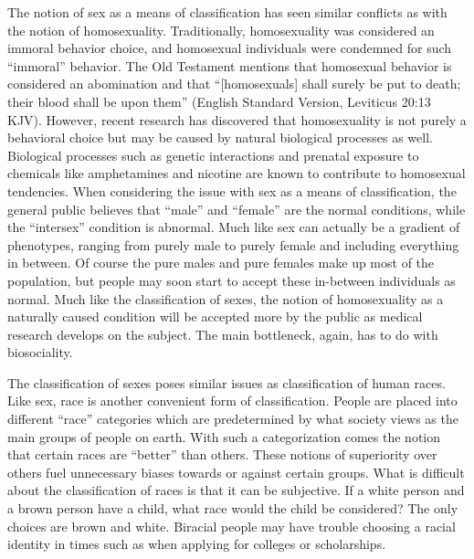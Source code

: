 The notion of sex as a means of classification has seen similar conflicts as with the notion of homosexuality. Traditionally, homosexuality was considered an immoral behavior choice, and homosexual individuals were condemned for such “immoral” behavior. The Old Testament mentions that homosexual behavior is considered an abomination and that “[homosexuals] shall surely be put to death; their blood shall be upon them” (English Standard Version, Leviticus 20:13 KJV). \cite{biblios20:13} However, recent research has discovered that homosexuality is not purely a behavioral choice but may be caused by natural biological processes as well. Biological processes such as genetic interactions and prenatal exposure to chemicals like amphetamines and nicotine are known to contribute to homosexual tendencies. \cite{savic} When considering the issue with sex as a means of classification, the general public believes that “male” and “female” are the normal conditions, while the “intersex” condition is abnormal.  Much like sex can actually be a gradient of phenotypes, ranging from purely male to purely female and including everything in between. Of course the pure males and pure females make up most of the population, but people may soon start to accept these in-between individuals as normal. Much like the classification of sexes, the notion of homosexuality as a naturally caused condition will be accepted more by the public as medical research develops on the subject. The main bottleneck, again, has to do with biosociality.

The classification of sexes poses similar issues as classification of human races. Like sex, race is another convenient form of classification. People are placed into different “race” categories which are predetermined by what society views as the main groups of people on earth. With such a categorization comes the notion that certain races are “better” than others. These notions of superiority over others fuel unnecessary biases towards or against certain groups. What is difficult about the classification of races is that it can be subjective. If a white person and a brown person have a child, what race would the child be considered? The only choices are brown and white. Biracial people may have trouble choosing a racial identity in times such as when applying for colleges or scholarships.
	
